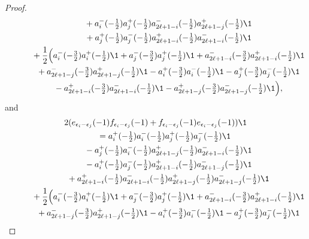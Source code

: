 \documentclass[pdftex]{sigma}
\begin{document}
\begin{proof}
\begin{gather}
\quad\qquad{} + a_i ^- (-\tfrac{1}{2})a_j ^+ (-\tfrac{1}{2}) a_{2\ell +1-i} ^-
(-\tfrac{1}{2}) a_{2\ell +1-j} ^+ (-\tfrac{1}{2}){\1} \nonumber \\
\quad\qquad{} + a_j ^+ (-\tfrac{1}{2})a_j ^- (-\tfrac{1}{2}) a_{2\ell +1-i} ^+
(-\tfrac{1}{2})
a_{2\ell +1-i} ^- (-\tfrac{1}{2}){\1} \nonumber \\
\quad \qquad{} +\frac{1}{2} \Big( a_i ^- (-\tfrac{3}{2}) a_i ^+
(-\tfrac{1}{2}){\1} + a_j ^- (-\tfrac{3}{2}) a_j ^+
(-\tfrac{1}{2}){\1} + a_{2\ell +1-i} ^- (-\tfrac{3}{2}) a_{2\ell
+1-i} ^+
(-\tfrac{1}{2}){\1}  \nonumber \\
\quad \qquad{} +a_{2\ell +1-j} ^- (-\tfrac{3}{2}) a_{2\ell +1-j} ^+
(-\tfrac{1}{2}){\1} - a_i ^+ (-\tfrac{3}{2}) a_i ^-
(-\tfrac{1}{2}){\1} - a_j ^+ (-\tfrac{3}{2}) a_j ^-
(-\tfrac{1}{2}){\1} \nonumber \\
\quad\qquad{} - a_{2\ell +1-i} ^+ (-\tfrac{3}{2}) a_{2\ell
+1-i}^- (-\tfrac{1}{2}){\1} - a_{2\ell +1-j} ^+ (-\tfrac{3}{2})
a_{2\ell
+1-j} ^- (-\tfrac{1}{2}){\1} \Big),\label{proof-Vir-3}
  \end{gather}
and \begin{gather}
 2(e_{\epsilon _{i}- \epsilon
_{j}}(-1)f_{\epsilon _{i}- \epsilon _{j}}(-1)+ f_{\epsilon _{i}-
\epsilon _{j}}(-1)e_{\epsilon _{i}-
\epsilon _{j}}(-1)){\1} \nonumber \\
\qquad{} = a_i ^+ (-\tfrac{1}{2})a_i ^- (-\tfrac{1}{2}) a_{j} ^+
(-\tfrac{1}{2}) a_{j} ^- (-\tfrac{1}{2}){\1} \nonumber \\
\quad\qquad{} - a_j ^+ (-\tfrac{1}{2})a_i ^- (-\tfrac{1}{2}) a_{2\ell +1-j} ^+
(-\tfrac{1}{2})
a_{2\ell +1-i} ^- (-\tfrac{1}{2}){\1} \nonumber \\
\quad\qquad{} - a_i ^+ (-\tfrac{1}{2})a_j ^- (-\tfrac{1}{2}) a_{2\ell +1-i} ^+
(-\tfrac{1}{2}) a_{2\ell +1-j} ^- (-\tfrac{1}{2}){\1}  \nonumber \\
\quad\qquad{} +a_{2\ell +1-i} ^+ (-\tfrac{1}{2})a_{2\ell +1-i} ^-
(-\tfrac{1}{2}) a_{2\ell +1-j} ^+ (-\tfrac{1}{2})
a_{2\ell +1-j} ^- (-\tfrac{1}{2}){\1} \nonumber \\
\quad\qquad{} +\frac{1}{2} \Big( a_i ^- (-\tfrac{3}{2}) a_i ^+
(-\tfrac{1}{2}){\1} + a_j ^- (-\tfrac{3}{2}) a_j ^+
(-\tfrac{1}{2}){\1} + a_{2\ell +1-i} ^- (-\tfrac{3}{2}) a_{2\ell
+1-i} ^+
(-\tfrac{1}{2}){\1}  \nonumber \\
\quad\qquad{} +a_{2\ell +1-j} ^- (-\tfrac{3}{2}) a_{2\ell +1-j} ^+
(-\tfrac{1}{2}){\1} - a_i ^+ (-\tfrac{3}{2}) a_i ^-
(-\tfrac{1}{2}){\1} - a_j ^+ (-\tfrac{3}{2}) a_j ^-
(-\tfrac{1}{2}){\1} \nonumber \\

\end{gather}
\end{proof}
\end{document}
